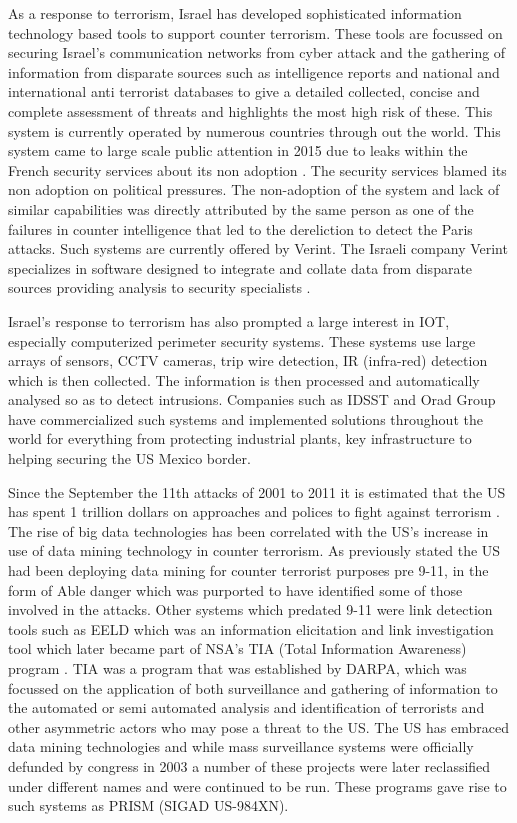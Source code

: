As a response to terrorism, Israel has developed sophisticated information technology based tools to support counter terrorism. These tools are focussed on securing Israel's communication networks from cyber attack and the gathering of information from disparate sources such as intelligence reports and national and international anti terrorist databases to give a detailed collected, concise and complete assessment of threats and highlights the most high risk of these. This system is currently operated by numerous countries through out the world. This system came to large scale public attention in 2015 due to leaks within the French security services about its non adoption \citep{Israelcounterterrorismlessonfrance}. 
The security services blamed its non adoption on political pressures. The non-adoption of the system and lack of similar capabilities was directly attributed by the same person as one of the failures in counter intelligence that led to the dereliction to detect the Paris attacks. Such systems are currently offered by Verint. The Israeli company Verint specializes in software designed to integrate and collate data from disparate sources providing analysis to security specialists \citep{zureik2010surveillance}.

Israel's response to terrorism has also prompted a large interest in IOT, especially  computerized perimeter security systems. These systems use large arrays of sensors, CCTV cameras, trip wire detection, IR (infra-red) detection which is then collected. The information is then processed and automatically analysed so as to detect intrusions. Companies such as IDSST and Orad Group \citep{gordon2011israel} have commercialized such systems and implemented solutions throughout the world for everything from  protecting industrial plants, key infrastructure to helping securing the US Mexico border.

Since the September the 11th attacks of 2001 to 2011 it is estimated that the US has spent 1 trillion dollars on approaches and polices to fight against terrorism \citep{roche2015intelligence}. The rise of big data technologies has been correlated with the US's increase in use of data mining technology in counter terrorism. As previously stated the US had been deploying data mining for counter terrorist purposes pre 9-11, in the form of Able danger which was purported to have identified some of those involved in the attacks. Other systems which predated 9-11 were link detection tools such as EELD \citep{mooney2002relational} which was an information elicitation and link investigation tool which later became part of NSA's TIA (Total Information Awareness) program \citep{deibel2016nsa}. TIA was a program that was established by DARPA, which was focussed on the application of both surveillance and gathering of information to the automated or semi automated analysis and identification of terrorists and other asymmetric actors who may pose a threat to the US. The US has embraced data mining technologies and while mass surveillance systems were officially defunded by congress in 2003 a number of these projects were later reclassified under different names and were continued to be run. These programs gave rise to such systems as PRISM (SIGAD US-984XN). 

